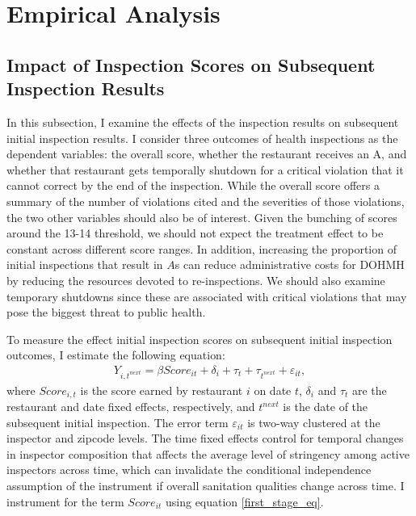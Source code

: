\documentclass[12pt]{article}
\begin{document}
\section{Empirical Analysis}
\label{empirical_sec}

\subsection{Impact of Inspection Scores on Subsequent Inspection Results}

In this subsection, I examine the effects of the inspection results on subsequent initial inspection results. I consider three outcomes of health inspections as the dependent variables: the overall score, whether the restaurant receives an A, and whether that restaurant gets temporally shutdown for a critical violation that it cannot correct by the end of the inspection. While the overall score offers a summary of the number of violations cited and the severities of those violations, the two other variables should also be of interest. Given the bunching of scores around the 13-14 threshold, we should not expect the treatment effect to be constant across different score ranges. In addition, increasing the proportion of initial inspections that result in $A$s can reduce administrative costs for DOHMH by reducing the resources devoted to re-inspections. We should also examine temporary shutdowns since these are associated with critical violations that may pose the biggest threat to public health. 

To measure the effect initial inspection scores on subsequent initial inspection outcomes, I estimate the following equation: 
\begin{align}
        Y_{i,t^{next}} = \beta Score_{it} + \delta_i + \tau_{t} + \tau_{t^{next}} + \varepsilon_{it},
        \label{score}
\end{align}
where $Score_{i,t}$ is the score earned by restaurant $i$ on date $t$, $\delta_i$ and $\tau_t$ are the restaurant and date fixed effects, respectively, and $t^{next}$ is the date of the subsequent initial inspection. The error term $\varepsilon_{it}$ is two-way clustered at the inspector and zipcode levels. The time fixed effects control for temporal changes in inspector composition that affects the average level of stringency among active inspectors across time, which can invalidate the conditional independence assumption of the instrument if overall sanitation qualities change across time. I instrument for the term $Score_{it}$ using equation \eqref{first_stage_eq}.  
\end{document}
